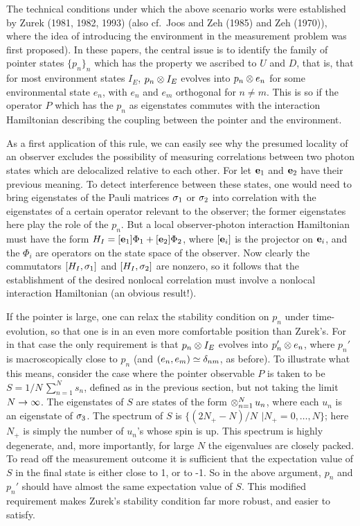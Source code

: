  The technical conditions under which the above scenario works were
established by Zurek (1981, 1982, 1993)  (also cf.\ Joos and Zeh (1985) and Zeh
(1970)), where the
idea of introducing the environment in the measurement problem was first
proposed).   In these
papers, the central issue is to identify the family of pointer states
$\{p_n\}_n$ which has the
property we ascribed to $U$ and $D$, that is, that for most environment states
$I_E$,  $p_n\otimes I_E$
evolves into $p_n\otimes e_n$ for some environmental state $e_n$, with $e_n$ and
$e_m$ orthogonal for
$n\neq m$.  This is so if the operator $P$ which has the $p_n$ as eigenstates
commutes with the
interaction Hamiltonian describing the coupling between the pointer and the
environment.

As a first application of this rule, we can easily see why the presumed
locality of an observer
 excludes the possibility of measuring correlations between two photon states
which are
delocalized relative to each other. For let ${\bf e}_1$  and  ${\bf e}_2$ have
their previous
meaning.
To detect interference between these states, one would need to bring
eigenstates of the Pauli
matrices $\sigma_1$ or $\sigma_2$ into correlation with the eigenstates of a certain
operator relevant to
the observer; the former eigenstates here play the role of the $p_n$. But a
local observer-photon
interaction Hamiltonian must have the form $H_I=[{\bf e}_1] \Phi_1 + [{\bf
e}_2]\Phi_2$, where
$[{\bf e}_i]$ is the projector on ${\bf e}_i$, and the $\Phi_i$ are operators
on the state space of
the observer. Now clearly the commutators $[H_I, \sigma_1]$ and $[H_I,\sigma_2]$
are  nonzero, so it follows that the establishment of the desired nonlocal
correlation must involve a
nonlocal interaction Hamiltonian (an obvious result!).

If the pointer is large, one can relax the stability condition on $p_n$ under
time-evolution,
so that one is in an even more comfortable position than Zurek's. For in that
case the only
requirement is that $p_n\otimes I_E$ evolves into $p_n'\otimes e_n$, where $p_n'$  is
macroscopically close
to $p_n$ (and $(e_n,e_m)\simeq \delta_{nm}$, as before). To illustrate what this
means, consider the
case where the pointer observable $P$ is taken to be $ S= 1/N\,\sum_{n=1}^N
s_n$, defined as in the
previous section, but not taking the limit $N\rightarrow\infty$. The eigenstates of
$S$ are states of the
form $\otimes_{n=1}^N\, u_n$, where each $u_n$ is an eigenstate of $\sigma_3$. The
spectrum of $S$ is
$\{(2N_+-N)/N\:\, |N_+=0,\ldots,N\}$; here $N_+$ is simply the number of
$u_n$'s whose spin is up.
This spectrum is highly degenerate, and, more importantly, for large $N$ the
eigenvalues are closely
packed. To read off the measurement outcome it is sufficient that the
expectation value of $S$ in the
final state is either close to 1, or to -1. So in the above argument, $p_n$ and
$p_n'$ should have
almost the same expectation value of $S$. This modified requirement makes
Zurek's stability condition
far more robust, and easier to satisfy.

